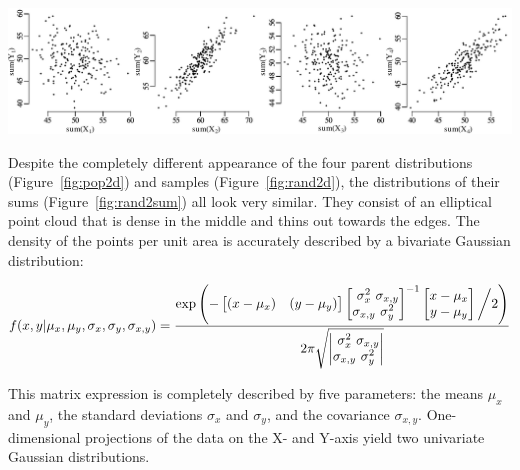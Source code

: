 \noindent\includegraphics[width=\textwidth]{../figures/rand2dsum.pdf}
\begingroup {}
\label{fig:rand2sum}
\endgroup

Despite the completely different appearance of the four parent
distributions (Figure~\ref{fig:pop2d}) and samples
(Figure~\ref{fig:rand2d}), the distributions of their sums
(Figure~\ref{fig:rand2sum}) all look very similar. They consist of an
elliptical point cloud that is dense in the middle and thins out
towards the edges. The density of the points per unit area is
accurately described by a bivariate Gaussian distribution:

\begin{equation}
f(x,y|\mu_x,\mu_y,\sigma_x,\sigma_y,\sigma_{x,y}) = \frac{
\exp\left(-
\left[\begin{array}{@{}cc@{}}
(x-\mu_x) & (y-\mu_y)
\end{array}\right]
\left[\begin{array}{@{}c@{}c@{}}
\sigma^2_x & \sigma_{x,y}\\
\sigma_{x,y} & \sigma^2_y
\end{array}\right]^{-1}
\left[\begin{array}{@{}c@{}}
x-\mu_x\\
y-\mu_y
\end{array}\right] \biggl/ 2
\right)
}{2\pi\sqrt{
\left|\begin{array}{@{}c@{}c@{}}
\sigma^2_x & \sigma_{x,y}\\
\sigma_{x,y} & \sigma^2_y
\end{array}\right|
}}
\label{eq:2dgauss}
\end{equation}

This matrix expression is completely described by five parameters: the
means $\mu_x$ and $\mu_y$, the standard deviations $\sigma_x$ and
$\sigma_y$, and the covariance $\sigma_{x,y}$. One-dimensional
projections of the data on the X- and Y-axis yield two univariate
Gaussian distributions.

